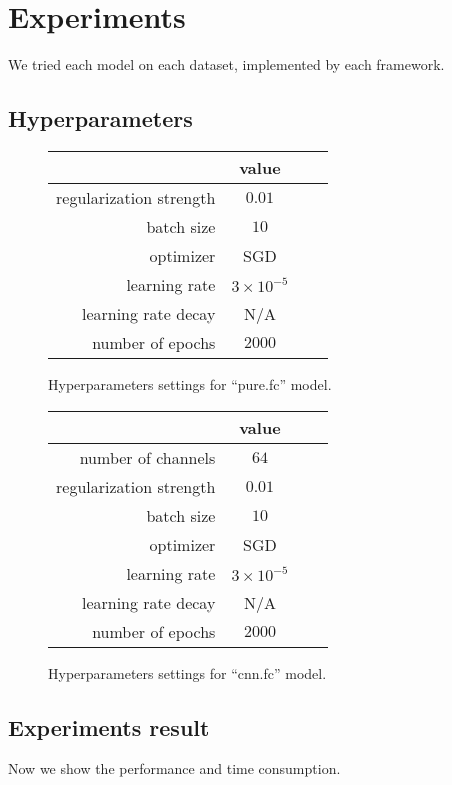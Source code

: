 \documentclass[a4paper]{article}
\begin{document}
\section{Experiments}

We tried each model on each dataset, implemented by each framework.

\subsection{Hyperparameters}

\begin{figure}[H]
\centering
\begin{tabular}{|r|c|c|c|}
\hline
 & value \\
\hline
regularization strength & $0.01$ \\
\hline
batch size & $10$ \\
\hline
optimizer & SGD \\
\hline
learning rate & $3\times10^{-5}$\\
\hline
learning rate decay & N/A \\
\hline
number of epochs & $2000$ \\
\hline
\end{tabular}
\caption{Hyperparameters settings for ``pure.fc'' model.}
\end{figure}

\begin{figure}[H]
\centering
\begin{tabular}{|r|c|c|c|}
\hline
 & value \\
\hline
number of channels & $64$ \\
\hline
regularization strength & $0.01$ \\
\hline
batch size & $10$ \\
\hline
optimizer & SGD \\
\hline
learning rate & $3\times10^{-5}$\\
\hline
learning rate decay & N/A \\
\hline
number of epochs & $2000$ \\
\hline
\end{tabular}
\caption{Hyperparameters settings for ``cnn.fc'' model.}
\end{figure}

\subsection{Experiments result}

Now we show the performance and time consumption.
\end{document}
